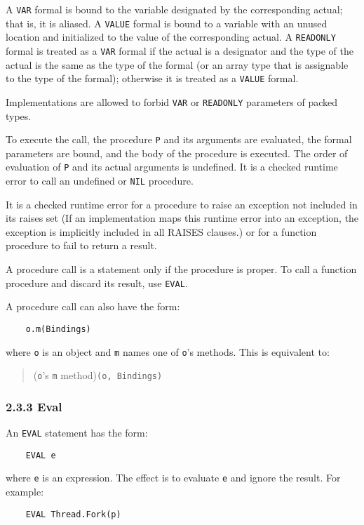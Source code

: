 \documentclass[10pt]{article}
\begin{document}
A \verb|VAR| formal is bound to the variable designated by the corresponding
actual; that is, it is aliased.  A \verb|VALUE| formal is bound to a variable
with an unused location and initialized to the value of the corresponding
actual.  A \verb|READONLY| formal is treated as a \verb|VAR| formal if the
actual is a designator and the type of the actual is the same as the type of
the formal (or an array type that is assignable to the type of the formal);
otherwise it is treated as a \verb|VALUE| formal.

Implementations are allowed to forbid \verb|VAR| or \verb|READONLY| parameters
of packed types.

To execute the call, the procedure \verb|P| and its arguments are evaluated,
the formal parameters are bound, and the body of the procedure is executed.
The order of evaluation of \verb|P| and its actual arguments is undefined.  It
is a checked runtime error to call an undefined or \verb|NIL| procedure.

It is a checked runtime error for a procedure to raise an exception not
included in its raises set (If an implementation maps this runtime error into
an exception, the exception is implicitly included in all RAISES clauses.) or
for a function procedure to fail to return a result.

A procedure call is a statement only if the procedure is proper.  To call a
function procedure and discard its result, use \verb|EVAL|.

A procedure call can also have the form:
\begin{verbatim}
    o.m(Bindings)
\end{verbatim}
where \verb|o| is an object and \verb|m| names one of \verb|o|'s methods.
This is equivalent to:
\begin{quote}
  (\verb|o|'s \verb|m| method)\verb|(o, Bindings)|
\end{quote}

\subsubsection*{2.3.3 Eval}

An \verb|EVAL| statement has the form:
\begin{verbatim}
    EVAL e
\end{verbatim}
where \verb|e| is an expression.  The effect is to evaluate \verb|e| and
ignore the result.  For example:
\begin{verbatim}
    EVAL Thread.Fork(p)
\end{verbatim}
\end{document}
